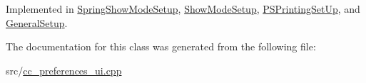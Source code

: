 Implemented in \hyperlink{a00144_ad79503ccd3982d1053695ea71cd22cce}{Spring\-Show\-Mode\-Setup}, \hyperlink{a00141_a576b720cc79bb0071c7ae7c14d800d49}{Show\-Mode\-Setup}, \hyperlink{a00121_a1ee957cf9840d2fc21e313f1b16e2e23}{P\-S\-Printing\-Set\-Up}, and \hyperlink{a00105_acce3f48c883d4c9033a5deaad3606196}{General\-Setup}.



The documentation for this class was generated from the following file\-:\begin{DoxyCompactItemize}
\item 
src/\hyperlink{a00187}{cc\-\_\-preferences\-\_\-ui.\-cpp}\end{DoxyCompactItemize}
